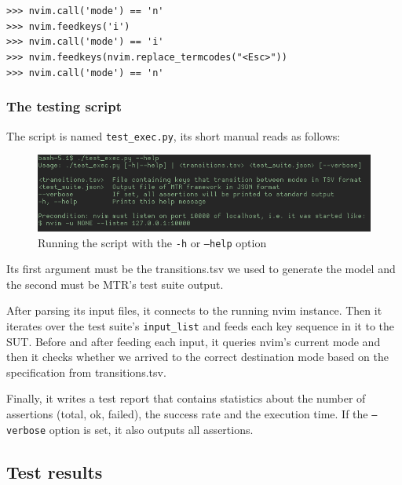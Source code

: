 \documentclass[12pt]{article}
\begin{document}
			{\parindent0pt
			\verb|>>> nvim.call('mode') == 'n'|\\
			\verb|>>> nvim.feedkeys('i')|\\
			\verb|>>> nvim.call('mode') == 'i'|\\
			\verb|>>> nvim.feedkeys(nvim.replace_termcodes("<Esc>"))|\\
			\verb|>>> nvim.call('mode') == 'n'|
			}

		\subsubsection{The testing script}

		The script is named \texttt{test\_exec.py}, its short manual reads as follows:

		\begin{figure}[!h]
			\centering
			\includegraphics[width=1\textwidth]{images/test_exec_help.png}
			\caption{Running the script with the \texttt{-h} or \texttt{---help} option}
		\end{figure}

		Its first argument must be the transitions.tsv we used to generate the model and the second must be MTR's test suite output.

		After parsing its input files, it connects to the running nvim instance. Then it iterates over the test suite's \texttt{input\_list} and feeds each key sequence in it to the SUT. Before and after feeding each input, it queries nvim's current mode and then it checks whether we arrived to the correct destination mode based on the specification from transitions.tsv.

		Finally, it writes a test report that contains statistics about the number of assertions (total, ok, failed), the success rate and the execution time. If the \texttt{---verbose} option is set, it also outputs all assertions.

	\subsection{Test results}
\end{document}
